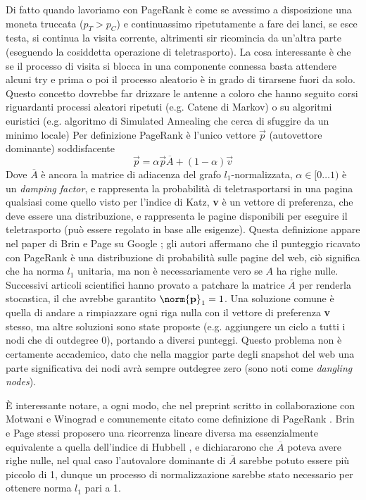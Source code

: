 Di fatto quando lavoriamo con PageRank è come se avessimo a disposizione una moneta truccata ($p_T >
p_C$) e continuassimo ripetutamente a fare dei lanci, se esce testa, si continua la visita corrente,
altrimenti sir ricomincia da un'altra parte (eseguendo la cosiddetta operazione di teletrasporto). La cosa interessante è che se il processo di visita si blocca in una componente connessa basta attendere alcuni try e prima o poi il processo aleatorio è in grado di tirarsene fuori da solo. Questo concetto dovrebbe far drizzare le antenne a coloro che hanno seguito corsi riguardanti processi aleatori ripetuti (e.g. Catene di Markov) o su algoritmi euristici (e.g. algoritmo di Simulated Annealing che cerca di sfuggire da un minimo locale)
Per definizione PageRank è l'unico vettore $\vec{p}$ (autovettore dominante) soddisfacente
\begin{equation}
    \vec{p} = \alpha\vec{p}\overline{A} + (1 - \alpha)\vec{v}
\end{equation}
Dove $\overline{A}$ è ancora la matrice di adiacenza del grafo $l_1$-normalizzata, $\alpha \in [0\dots1)$ è un \textit{damping factor}, e rappresenta la probabilità di teletrasportarsi in una pagina qualsiasi come quello visto per l'indice di Katz, \textbf{v} è un vettore di preferenza, che deve essere una distribuzione, e rappresenta le pagine disponibili per eseguire il teletrasporto (può essere regolato in base alle esigenze). Questa definizione appare nel paper di Brin e Page su Google \cite{google}; gli autori affermano che il punteggio ricavato con PageRank è una distribuzione di probabilità sulle pagine del web, ciò significa che ha norma $l_1$ unitaria, ma non è necessariamente vero se $A$ ha righe nulle. Successivi articoli scientifici hanno provato a patchare la matrice $\overline{A}$ per renderla stocastica, il che avrebbe garantito $\norm{\textbf{p}}_1 = 1$. Una soluzione comune è quella di andare a rimpiazzare ogni riga nulla con il vettore di preferenza \textbf{v} stesso, ma altre soluzioni sono state proposte (e.g. aggiungere un ciclo a tutti i nodi che di outdegree 0), portando a diversi punteggi. Questo problema non è certamente accademico, dato che nella maggior parte degli snapshot del web una parte significativa dei nodi avrà sempre outdegree zero (sono noti come \textit{dangling nodes}).

È interessante notare, a ogni modo, che nel preprint scritto in collaborazione con Motwani e Winograd e comunemente citato come definizione di PageRank \cite{prankpreprint}. Brin e Page stessi proposero una ricorrenza lineare diversa ma essenzialmente equivalente a quella dell'indice di Hubbell \cite{hub}, e dichiararono che $\overline{A}$ poteva avere righe nulle, nel qual caso l'autovalore dominante di $\overline{A}$ sarebbe potuto essere più piccolo di 1, dunque un processo di normalizzazione sarebbe stato necessario per ottenere norma $l_1$ pari a 1.

